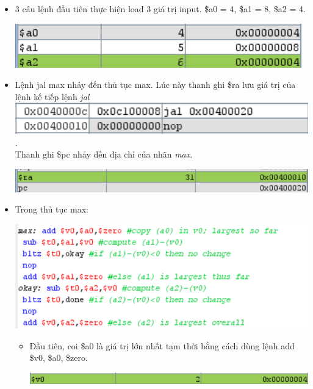 \documentclass[12pt,a4paper,oneside]{article}
\begin{document}
	\begin{itemize}
	\item 3 câu lệnh đầu tiên thực hiện load 3 giá trị input. \$a0 = 4, \$a1 = 8, \$a2 = 4.
	\begin{center}
	\includegraphics[scale=1]{image/2.1}
	\end{center}
 	\item Lệnh \colorbox{code}{jal max} nhảy đến thủ tục max. Lúc này thanh ghi \$ra lưu giá trị của lệnh kế tiếp lệnh \textit{jal} \quad \includegraphics[scale=1]{image/2.2.0}. \\Thanh ghi \$pc nhảy đến địa chỉ của nhãn \textit{max}.
 	\begin{center}
 	\includegraphics[scale=1]{image/2.2}
 	\end{center}
 	\item Trong thủ tục max:
 	\begin{center}
 	\includegraphics[scale=1]{image/2.3}
 	\end{center}
 		\begin{itemize}
 		\item Đầu tiên, coi \$a0 là giá trị lớn nhất tạm thời bằng cách dùng lệnh \colorbox{code}{add \$v0, \$a0, \$zero}.
 		\begin{center}
 		\includegraphics[scale=1]{image/2.4}
 		\end{center}

\end{itemize}
\end{itemize}
\end{document}
